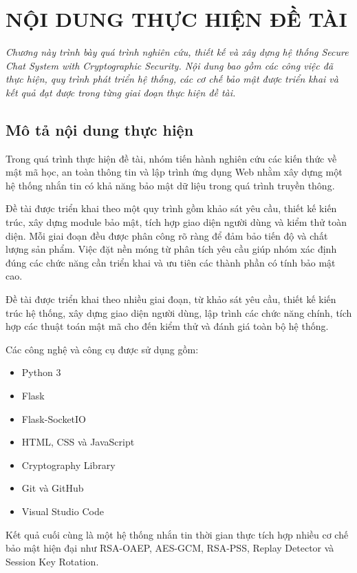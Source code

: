 \chapter{NỘI DUNG THỰC HIỆN ĐỀ TÀI}

\textit{Chương này trình bày quá trình nghiên cứu, thiết kế và xây dựng hệ thống Secure Chat System with Cryptographic Security. Nội dung bao gồm các công việc đã thực hiện, quy trình phát triển hệ thống, các cơ chế bảo mật được triển khai và kết quả đạt được trong từng giai đoạn thực hiện đề tài.}

\section{Mô tả nội dung thực hiện}

Trong quá trình thực hiện đề tài, nhóm tiến hành nghiên cứu các kiến thức về mật mã học, an toàn thông tin và lập trình ứng dụng Web nhằm xây dựng một hệ thống nhắn tin có khả năng bảo mật dữ liệu trong quá trình truyền thông.

Đề tài được triển khai theo một quy trình gồm khảo sát yêu cầu, thiết kế kiến trúc, xây dựng module bảo mật, tích hợp giao diện người dùng và kiểm thử toàn diện. Mỗi giai đoạn đều được phân công rõ ràng để đảm bảo tiến độ và chất lượng sản phẩm. Việc đặt nền móng từ phân tích yêu cầu giúp nhóm xác định đúng các chức năng cần triển khai và ưu tiên các thành phần có tính bảo mật cao.

Đề tài được triển khai theo nhiều giai đoạn, từ khảo sát yêu cầu, thiết kế kiến trúc hệ thống, xây dựng giao diện người dùng, lập trình các chức năng chính, tích hợp các thuật toán mật mã cho đến kiểm thử và đánh giá toàn bộ hệ thống.

Các công nghệ và công cụ được sử dụng gồm:

\begin{itemize}
\item Python 3
\item Flask
\item Flask-SocketIO
\item HTML, CSS và JavaScript
\item Cryptography Library
\item Git và GitHub
\item Visual Studio Code
\end{itemize}

Kết quả cuối cùng là một hệ thống nhắn tin thời gian thực tích hợp nhiều cơ chế bảo mật hiện đại như RSA-OAEP, AES-GCM, RSA-PSS, Replay Detector và Session Key Rotation.

